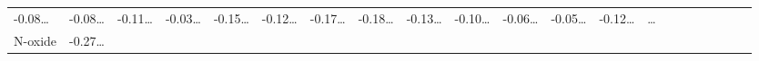 \documentclass[
]{article}
\begin{document}
\begin{longtable}[]{@{}lllllllllllllllllllll@{}}
\begin{minipage}[t]{0.03\columnwidth}
-0.08\ldots{}\strut
\end{minipage} & \begin{minipage}[t]{0.03\columnwidth}\raggedright
-0.08\ldots{}\strut
\end{minipage} & \begin{minipage}[t]{0.03\columnwidth}\raggedright
-0.11\ldots{}\strut
\end{minipage} & \begin{minipage}[t]{0.03\columnwidth}\raggedright
-0.03\ldots{}\strut
\end{minipage} & \begin{minipage}[t]{0.03\columnwidth}\raggedright
-0.15\ldots{}\strut
\end{minipage} & \begin{minipage}[t]{0.03\columnwidth}\raggedright
-0.12\ldots{}\strut
\end{minipage} & \begin{minipage}[t]{0.03\columnwidth}\raggedright
-0.17\ldots{}\strut
\end{minipage} & \begin{minipage}[t]{0.03\columnwidth}\raggedright
-0.18\ldots{}\strut
\end{minipage} & \begin{minipage}[t]{0.03\columnwidth}\raggedright
-0.13\ldots{}\strut
\end{minipage} & \begin{minipage}[t]{0.03\columnwidth}\raggedright
-0.10\ldots{}\strut
\end{minipage} & \begin{minipage}[t]{0.03\columnwidth}\raggedright
-0.06\ldots{}\strut
\end{minipage} & \begin{minipage}[t]{0.03\columnwidth}\raggedright
-0.05\ldots{}\strut
\end{minipage} & \begin{minipage}[t]{0.03\columnwidth}\raggedright
-0.12\ldots{}\strut
\end{minipage} & \begin{minipage}[t]{0.01\columnwidth}\raggedright
\ldots{}\strut
\end{minipage}\tabularnewline
\begin{minipage}[t]{0.03\columnwidth}\raggedright
N-oxide\strut
\end{minipage} & \begin{minipage}[t]{0.03\columnwidth}\raggedright
-0.27\ldots{}\strut
\end{minipage} & \begin{minipage}[t]{0.03\columnwidth}\raggedright

\end{minipage}
\end{longtable}
\end{document}
